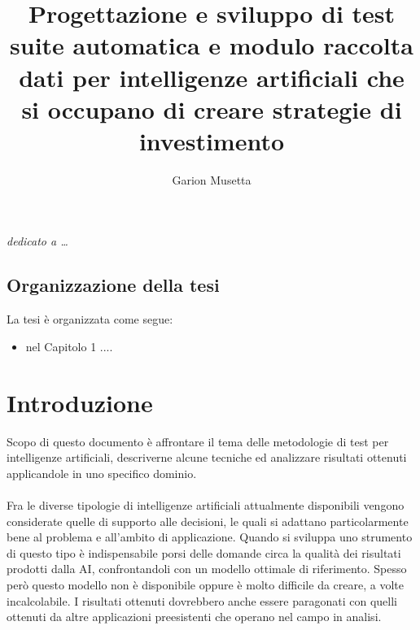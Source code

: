 \documentclass[a4paper,12pt]{report}
\begin{document}
\title{Progettazione e sviluppo di test suite automatica e modulo raccolta dati per intelligenze artificiali che si occupano di creare strategie di investimento}
\author{Garion Musetta}
%
% 
%
\beforepreface
\prefacesection{}
        {\hfill \Large {\sl dedicato a \dots}}
% 
%

%
%
\section*{Organizzazione della tesi}
\label{organizzazione}
La tesi \`e organizzata come segue:
\begin{itemize}
\item nel Capitolo 1 ....
\end{itemize}
%
%

\afterpreface
% 
% 
%
%


\chapter{Introduzione}
\label{cap1}
Scopo di questo documento è affrontare il tema delle metodologie di test per intelligenze artificiali, descriverne alcune tecniche ed analizzare risultati ottenuti applicandole in uno specifico dominio.
\\~\\
Fra le diverse tipologie di intelligenze artificiali attualmente disponibili vengono considerate quelle di supporto alle decisioni, le quali si adattano particolarmente bene al problema e all'ambito di applicazione. Quando si sviluppa uno strumento di questo tipo è indispensabile porsi delle domande circa la qualità dei risultati prodotti dalla AI, confrontandoli con un modello ottimale di riferimento. Spesso però questo modello non è disponibile oppure è molto difficile da creare, a volte incalcolabile. I risultati ottenuti dovrebbero anche essere paragonati con quelli ottenuti da altre applicazioni preesistenti che operano nel campo in analisi.
\end{document}
